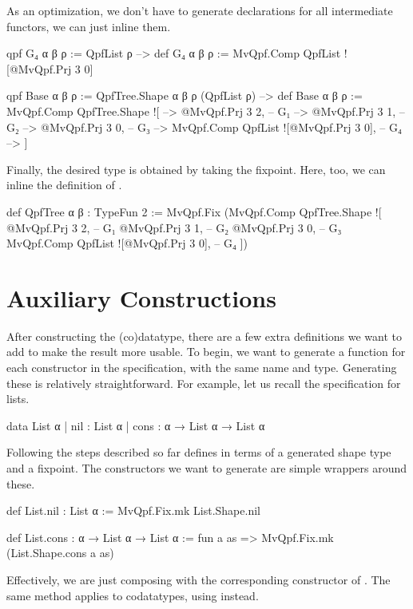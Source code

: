 As an optimization, we don't have to generate  declarations for all intermediate functors, we can just
inline them.
\begin{leancode}
  qpf G₄ α β ρ := QpfList ρ 
    --> def G₄ α β ρ := MvQpf.Comp QpfList ![@MvQpf.Prj 3 0]

  qpf Base α β ρ := QpfTree.Shape α β ρ (QpfList ρ)
    --> def Base α β ρ := MvQpf.Comp QpfTree.Shape ![
    -->     @MvQpf.Prj 3 2,                       -- G₁ 
    -->     @MvQpf.Prj 3 1,                       -- G₂ 
    -->     @MvQpf.Prj 3 0,                       -- G₃
    -->     MvQpf.Comp QpfList ![@MvQpf.Prj 3 0], -- G₄
    --> ]
\end{leancode}



Finally, the desired type is obtained by taking the fixpoint. Here, too, we can inline the definition
of .
\begin{leancode}
  def QpfTree α β : TypeFun 2 :=
    MvQpf.Fix (MvQpf.Comp QpfTree.Shape ![
        @MvQpf.Prj 3 2,                       -- G₁ 
        @MvQpf.Prj 3 1,                       -- G₂ 
        @MvQpf.Prj 3 0,                       -- G₃
        MvQpf.Comp QpfList ![@MvQpf.Prj 3 0], -- G₄
    ])
\end{leancode}




\section{Auxiliary Constructions}%
\label{sec:aux_constructions}

After constructing the (co)datatype, there are a few extra definitions we want to add to make the result more usable. To begin, we want to generate a function for each constructor 
in the specification, with the same name and type. Generating these is relatively straightforward.
For example, let us recall the specification for lists.
\begin{leancode}
  data List α
    | nil  : List α 
    | cons : α → List α → List α
\end{leancode}
Following the steps described so far defines  in terms of a generated shape type 
and a fixpoint. The constructors we want to generate are simple wrappers around these.
\begin{leancode}
  def List.nil : List α 
    := MvQpf.Fix.mk List.Shape.nil

  def List.cons : α → List α → List α 
    := fun a as => MvQpf.Fix.mk (List.Shape.cons a as)
\end{leancode}
Effectively, we are just composing  with the corresponding constructor of .
The same method applies to codatatypes, using  instead.

